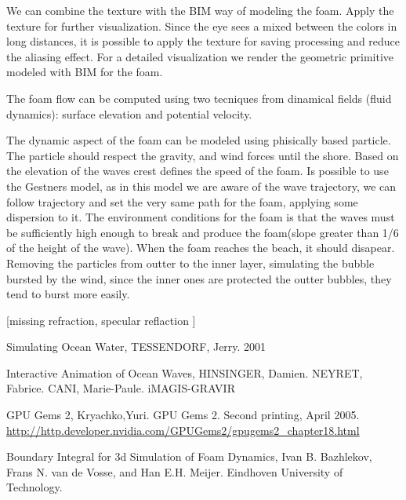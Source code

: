 \documentclass{report}
\begin{document}
We can combine the texture with the BIM way of modeling the foam. Apply the texture for further visualization. Since the eye sees a mixed between the colors in long distances, it is possible to apply the texture for saving processing and reduce the aliasing effect.
For a detailed visualization we render the geometric primitive modeled with BIM for the foam.

The foam flow can be computed using two tecniques from dinamical fields (fluid dynamics): surface elevation and potential velocity.

The dynamic aspect of the foam can be modeled using phisically based particle. The particle should respect the gravity, and wind forces until the shore. Based on the elevation of the waves crest defines the speed of the foam. Is possible to use the Gestners model, as in this model we are aware of the wave trajectory, we can follow trajectory and set the very same path for the foam, applying some dispersion to it\cite{iaow}.
The environment conditions for the foam is that the waves must be sufficiently high enough to break and produce the foam(slope greater than 1/6 \cite{sow} of the height of the wave).
When the foam reaches the beach, it should disapear. Removing the particles from outter to the inner layer, simulating the bubble bursted by the wind, since the inner ones are protected the outter bubbles, they tend to burst more easily.

[missing refraction, specular reflaction ]


\begin{thebibliography}{9}

  Simulating Ocean Water,
  TESSENDORF, Jerry.
  2001

  Interactive Animation of Ocean Waves,
  HINSINGER, Damien. NEYRET, Fabrice. CANI, Marie-Paule.
  iMAGIS-GRAVIR

  GPU Gems 2,
  Kryachko,Yuri.
  GPU Gems 2. 
  Second printing, April 2005.
  \url{http://http.developer.nvidia.com/GPUGems2/gpugems2_chapter18.html}

  Boundary Integral for 3d Simulation of Foam Dynamics,
  Ivan B. Bazhlekov, Frans N. van de Vosse, and Han E.H. Meijer.
  Eindhoven University of Technology.

\end{thebibliography}
\end{document}
